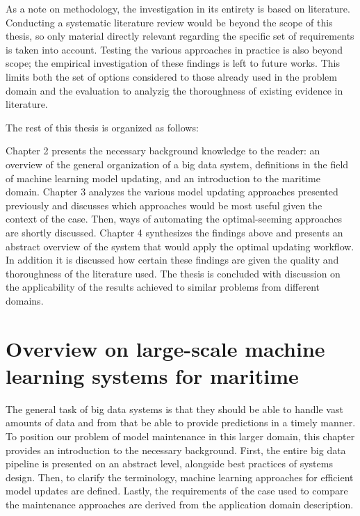 
As a note on methodology, the investigation in its entirety is based on literature. Conducting a systematic literature review would be beyond the scope of this thesis, so only material directly relevant regarding the specific set of requirements is taken into account. Testing the various approaches in practice is also beyond scope; the empirical investigation of these findings is left to future works. This limits both the set of options considered to those already used in the problem domain and the evaluation to analyzig the thoroughness of existing evidence in literature.


The rest of this thesis is organized as follows:

Chapter 2 presents the necessary background knowledge to the reader: an overview of the general organization of a big data system, definitions in the field of machine learning model updating, and an introduction to the maritime domain. Chapter 3 analyzes the various model updating approaches presented previously and discusses which approaches would be most useful given the context of the case. Then, ways of automating the optimal-seeming approaches are shortly discussed. Chapter 4 synthesizes the findings above and presents an abstract overview of the system that would apply the optimal updating workflow. In addition it is discussed how certain these findings are given the quality and thoroughness of the literature used. The thesis is concluded with discussion on the applicability of the results achieved to similar problems from different domains.

\chapter{Overview on large-scale machine learning systems for maritime}


The general task of big data systems is that they should be able to handle vast amounts of data and from that be able to provide predictions in a timely manner. To position our problem of model maintenance in this larger domain, this chapter provides an introduction to the necessary background. First, the entire big data pipeline is presented on an abstract level, alongside best practices of systems design. Then, to clarify the terminology, machine learning approaches for efficient model updates are defined. Lastly, the requirements of the case used to compare the maintenance approaches are derived from the application domain description.

